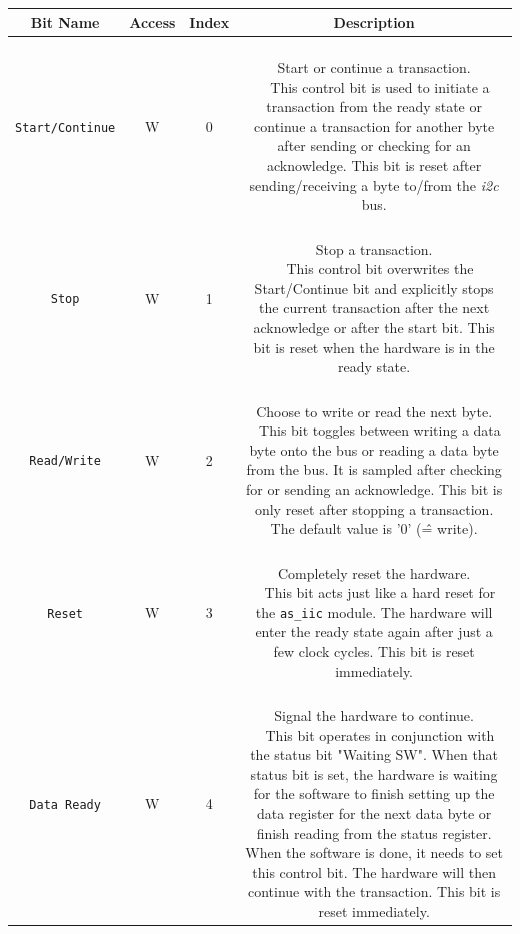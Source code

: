 \begin{longtable}[htb]{|c|c|c|c|}
\hline 
\textbf{Bit Name} & \textbf{Access} & \textbf{Index} & \textbf{Description} \\
\hline
\endhead

\texttt{Start/Continue} & W & 0 &
\parbox{9cm}{ ~ \\ Start or continue a transaction. \\ ~ \small
This control bit is used to initiate a transaction from the ready state or continue a transaction for another byte after sending or checking for an acknowledge.
This bit is reset after sending/receiving a byte to/from the \textit{i2c} bus.
\vspace{0.3em} } \\

\hline 

\texttt{Stop} & W & 1 &
\parbox{9cm}{ ~ \\ Stop a transaction. \\ ~ \small
This control bit overwrites the Start/Continue bit and explicitly stops the current transaction after the next acknowledge or after the start bit.
This bit is reset when the hardware is in the ready state.
\vspace{0.3em} } \\

\hline 

\texttt{Read/Write} & W & 2 &
\parbox{9cm}{ ~ \\ Choose to write or read the next byte. \\ ~ \small
This bit toggles between writing a data byte onto the bus or reading a data byte from the bus.
It is sampled after checking for or sending an acknowledge.
This bit is only reset after stopping a transaction.
The default value is '0' (\^= write).
\vspace{0.3em} } \\

\hline

\texttt{Reset} & W & 3 &
\parbox{9cm}{ ~ \\ Completely reset the hardware. \\ ~ \small
This bit acts just like a hard reset for the \texttt{as\_iic} module.
The hardware will enter the ready state again after just a few clock cycles.
This bit is reset immediately.
\vspace{0.3em} } \\

\hline

\texttt{Data Ready} & W & 4 &
\parbox{9cm}{ ~ \\ Signal the hardware to continue. \\ ~ \small
This bit operates in conjunction with the status bit "Waiting SW".
When that status bit is set, the hardware is waiting for the software to finish setting up the data register for the next data byte or finish reading from the status register.
When the software is done, it needs to set this control bit.
The hardware will then continue with the transaction.
This bit is reset immediately.
\vspace{0.3em} } \\


\end{longtable}
